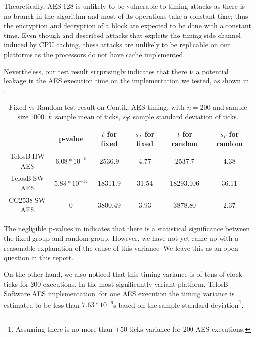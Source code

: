 Theoretically, AES-128 is unlikely to be vulnerable to timing attacks as there is no branch in the algorithm and most of its operations take a constant time; thus the encryption and decryption of a block are expected to be done with a constant time. Even though \cite{Cache-Timing1} and \cite{Cache-Timing2} described attacks that exploits the timing side channel induced by CPU caching, these attacks are unlikely to be replicable on our platforms as the processors do not have cache implemented. 

Nevertheless, our test result surprisingly indicates that there is a potential leakage in the AES execution time on the implementation we tested, as shown in .

\begin{table}[ht!]
	\centering
	\begin{tabular}{|c|c|c|c|c|c|}
		\hline
		              & p-value           & $\overline{t}$ for fixed & $s_{T}$ for fixed & $\overline{t}$ for random & $s_{T}$ for random\\ \hline
		TelosB HW AES & $6.08 * 10^{-5}$  & 2536.9     & 4.77      & 2537.7      & 4.38       \\ \hline
		TelosB SW AES & $5.88 * 10^{-14}$ & 18311.9    & 31.54     & 18293.106   & 36.11      \\ \hline
		CC2538 SW AES & 0                 & 3800.49    & 3.93      & 3878.80     & 2.37       \\ \hline
	\end{tabular}
	\caption{Fixed vs Random test result on Contiki AES timing, with $n=200$ and sample size 1000. $\overline{t}$: sample mean of ticks, $s_{T}$: sample standard deviation of ticks.}
	\label{Tbl: Fixed vs Random test on Contiki AES timing}
\end{table}

The negligible p-values in  indicates that there is a statistical significance between the fixed group and random group. However, we have not yet came up with a reasonable explanation of the cause of this variance. We leave this as an open question in this report.

On the other hand, we also noticed that this timing variance is of tens of clock ticks for $200$ executions. In the most significantly variant platform, TelosB Software AES implementation, for one AES execution the timing variance is estimated to be less than $7.63 * 10^{-6}$s based on the sample standard deviation\footnote{Assuming there is no more than $\pm50$ ticks variance for 200 AES executions.}.

